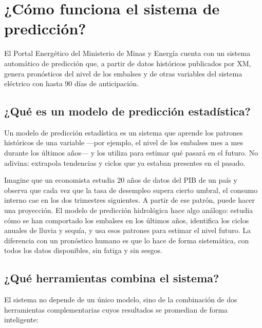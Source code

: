 \documentclass[11pt,a4paper]{article}
\begin{document}
\section{¿Cómo funciona el sistema de predicción?}

El Portal Energético del Ministerio de Minas y Energía cuenta con un sistema automático de predicción que, a partir de datos históricos publicados por XM, genera pronósticos del nivel de los embalses y de otras variables del sistema eléctrico con hasta 90 días de anticipación.

\subsection{¿Qué es un modelo de predicción estadística?}

Un modelo de predicción estadística es un sistema que aprende los patrones históricos de una variable —por ejemplo, el nivel de los embalses mes a mes durante los últimos años— y los utiliza para estimar qué pasará en el futuro. No adivina: extrapola tendencias y ciclos que ya estaban presentes en el pasado.

\begin{highlightbox}
Imagine que un economista estudia 20 años de datos del PIB de un país y observa que cada vez que la tasa de desempleo supera cierto umbral, el consumo interno cae en los dos trimestres siguientes. A partir de ese patrón, puede hacer una proyección. El modelo de predicción hidrológica hace algo análogo: estudia cómo se han comportado los embalses en los últimos años, identifica los ciclos anuales de lluvia y sequía, y usa esos patrones para estimar el nivel futuro. La diferencia con un pronóstico humano es que lo hace de forma sistemática, con todos los datos disponibles, sin fatiga y sin sesgos.
\end{highlightbox}

\subsection{¿Qué herramientas combina el sistema?}

El sistema no depende de un único modelo, sino de la combinación de dos herramientas complementarias cuyos resultados se promedian de forma inteligente:

\vspace{2mm}
\end{document}
